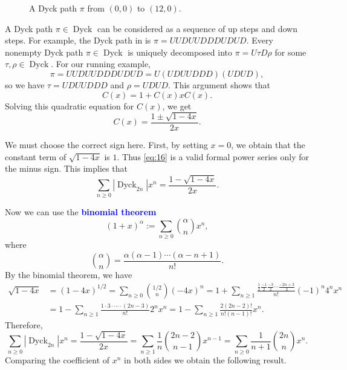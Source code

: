 \documentclass[oneside]{book}
\numberwithin{equation}{section}
\theoremstyle{definition}
\newcommand{\Dyck}{\operatorname{Dyck}}
\renewcommand\emph[1]{\textcolor{blue}{\bf #1}}
\begin{document}
\begin{figure}
  \centering
  \caption{A Dyck path \( \pi \) from \( (0,0) \) to \( (12,0) \).}
  \label{fig:dyck-path2}
\end{figure}

A Dyck path \( \pi \in \Dyck \) can be considered as a sequence of up
steps and down steps. For example, the Dyck path in
 is \( \pi = UUDUUDDDUDUD \). Every nonempty Dyck
path \( \pi \in \Dyck \) is uniquely decomposed into
\( \pi = U \tau D \rho \) for some \( \tau,\rho\in \Dyck \). For our
running example,
\begin{equation}\label{eq:dyck-decomp}
  \pi=UUDUUDDDUDUD = U(UDUUDDD)(UDUD),
\end{equation}
so we have
\( \tau = UDUUDDD \) and \( \rho = UDUD \).
This argument shows that
\begin{equation}\label{eq:cat-gf}
  C(x) = 1 + C(x) x C(x).
\end{equation}
Solving this quadratic equation for \( C(x) \), we
get
\begin{equation}\label{eq:16}
   C(x)  = \frac{1\pm\sqrt{1-4x}}{2x}.
  \end{equation}

  We must choose the correct sign here. First, by setting \( x=0 \),
  we obtain that the constant term of \( \sqrt{1-4x} \) is \( 1 \).
  Thus \eqref{eq:16} is a valid formal power series only for the minus
  sign. This implies that
  \[
    \sum_{n\ge0} |\Dyck_{2n}| x^n = \frac{1-\sqrt{1-4x}}{2x}.
  \]
 
  Now we can use the \emph{binomial theorem}
\[
  (1+x)^\alpha := \sum_{n\ge 0} \binom{\alpha}{n} x^n,
\]
where
\[
  \binom{\alpha}{n} = \frac{\alpha(\alpha-1)\cdots (\alpha-n+1)}{n!}.
\]
By the binomial theorem, we have
  \begin{align*}
    \sqrt{1-4x}
    &= (1-4x)^{1/2} = \sum_{n\ge 0} \binom{1/2}{n} (-4x)^n
    = 1+ \sum_{n\ge 1} \frac{\frac{1}{2} \frac{-1}{2}
    \frac{-3}{2} \cdots \frac{-2n+3}{2}}{n!} (-1)^n 4^n x^n\\
    &= 1- \sum_{n\ge 1} \frac{1\cdot 3\cdot \cdots \cdot (2n-3)}{n!} 2^n x^n
    = 1- \sum_{n\ge 1} \frac{2(2n-2)!}{n!(n-1)!} x^n .
  \end{align*}
  Therefore,
  \[
   \sum_{n\ge0} |\Dyck_{2n}| x^n = \frac{1-\sqrt{1-4x}}{2x} 
   = \sum_{n\ge 1} \frac{1}{n} \binom{2n-2}{n-1} x^{n-1}
   = \sum_{n\ge 0} \frac{1}{n+1} \binom{2n}{n} x^n.
  \]
  Comparing the coefficient of \( x^n \) in both sides we obtain the
  following result.
\end{document}
